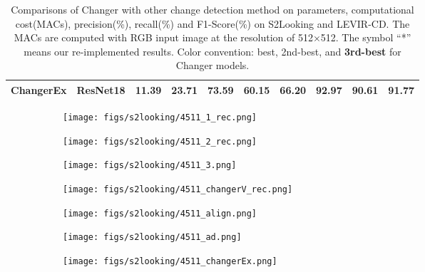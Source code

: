 \documentclass[10pt,twocolumn,letterpaper]{article}
\begin{document}
\begin{table*}
\begin{tabular}{@{}l|c|c|c|ccc|ccc@{}}
    ChangerEx & ResNet18 & 11.39 & 23.71 & {\color{blue} 73.59} & {\color{red} 60.15} & {\color{red} 66.20} & \textbf{92.97} & {\color{red} 90.61} & {\color{red} 91.77}\\
    \bottomrule[1pt]
  \end{tabular}
  \caption{Comparisons of Changer with other change detection method on parameters, computational cost(MACs), precision(\%), recall(\%) and F1-Score(\%) on S2Looking and LEVIR-CD. The MACs are computed  with RGB input image at the resolution of 512×512. The symbol ``*'' means our re-implemented results. Color convention: {\color{red} best}, {\color{blue} 2nd-best}, and \textbf{3rd-best} for Changer models.}
  \label{table1}
\end{table*}


\begin{figure*}
  \centering
  \begin{subfigure}{0.138\linewidth}
    \texttt{[image: figs/s2looking/4511\_1\_rec.png]}
\label{fig:short-a1}
  \end{subfigure}
  \hfill
  \begin{subfigure}{0.138\linewidth}
    \texttt{[image: figs/s2looking/4511\_2\_rec.png]}
\label{fig:short-a2}
  \end{subfigure}
  \hfill
  \begin{subfigure}{0.138\linewidth}
    \texttt{[image: figs/s2looking/4511\_3.png]}
\label{fig:short-a3}
  \end{subfigure}
  \hfill
  \begin{subfigure}{0.138\linewidth}
    \texttt{[image: figs/s2looking/4511\_changerV\_rec.png]}
\label{fig:short-a4}
  \end{subfigure}
  \hfill
  \begin{subfigure}{0.138\linewidth}
    \texttt{[image: figs/s2looking/4511\_align.png]}
\label{fig:short-a5}
  \end{subfigure}
  \hfill
  \begin{subfigure}{0.138\linewidth}
    \texttt{[image: figs/s2looking/4511\_ad.png]}
\label{fig:short-a6}
  \end{subfigure}
  \hfill
  \begin{subfigure}{0.138\linewidth}
    \texttt{[image: figs/s2looking/4511\_changerEx.png]}
\label{fig:short-a7}
  \end{subfigure}
  

\end{figure*}
\end{document}
